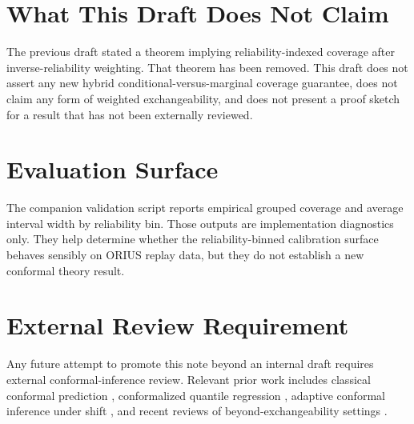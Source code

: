 \documentclass[conference]{IEEEtran}
\begin{document}
\section{What This Draft Does Not Claim}
The previous draft stated a theorem implying reliability-indexed coverage after inverse-reliability weighting. That theorem has been removed. This draft does not assert any new hybrid conditional-versus-marginal coverage guarantee, does not claim any form of weighted exchangeability, and does not present a proof sketch for a result that has not been externally reviewed.

\section{Evaluation Surface}
The companion validation script reports empirical grouped coverage and average interval width by reliability bin. Those outputs are implementation diagnostics only. They help determine whether the reliability-binned calibration surface behaves sensibly on ORIUS replay data, but they do not establish a new conformal theory result.

\section{External Review Requirement}
Any future attempt to promote this note beyond an internal draft requires external conformal-inference review. Relevant prior work includes classical conformal prediction \cite{vovk2005algorithmic}, conformalized quantile regression \cite{romano2019conformalized}, adaptive conformal inference under shift \cite{gibbs2021adaptive}, and recent reviews of beyond-exchangeability settings \cite{barber2023beyond}.



\end{document}
